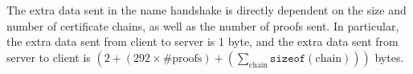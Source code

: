 The extra data sent in the \ac{name} handshake is directly dependent
on the size and number of certificate chains, as well as the number of
proofs sent. In particular, the extra data sent from client to server
is 1 byte, and the extra data sent from server to client is
$(2 + (292 \times \text{\#proofs}) +
(\sum_{\text{chain}}\texttt{sizeof}(\text{chain})))$ bytes. 


